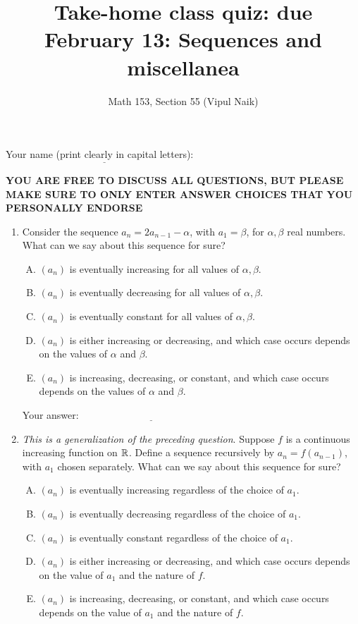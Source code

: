\documentclass[10pt]{amsart}
\title{Take-home class quiz: due February 13: Sequences and miscellanea}
\author{Math 153, Section 55 (Vipul Naik)}
\begin{document}
\maketitle

Your name (print clearly in capital letters): $\underline{\qquad\qquad\qquad\qquad\qquad\qquad\qquad\qquad\qquad\qquad}$

{\bf YOU ARE FREE TO DISCUSS ALL QUESTIONS, BUT PLEASE MAKE SURE TO
ONLY ENTER ANSWER CHOICES THAT YOU PERSONALLY ENDORSE}

\begin{enumerate}
\item Consider the sequence $a_n = 2a_{n-1} - \alpha$, with $a_1 =
  \beta$, for $\alpha, \beta$ real numbers. What can we say about this
  sequence for sure?

  \begin{enumerate}[(A)]
  \item $(a_n)$ is eventually increasing for all values of $\alpha,
    \beta$.
  \item $(a_n)$ is eventually decreasing for all values of $\alpha,
    \beta$.
  \item $(a_n)$ is eventually constant for all values of $\alpha,
    \beta$.
  \item $(a_n)$ is either increasing or decreasing, and which case
    occurs depends on the values of $\alpha$ and $\beta$.
  \item $(a_n)$ is increasing, decreasing, or constant, and which case
    occurs depends on the values of $\alpha$ and $\beta$.
  \end{enumerate}

  \vspace{0.1in}
  Your answer: $\underline{\qquad\qquad\qquad\qquad\qquad\qquad\qquad}$
  \vspace{0.15in}

\item {\em This is a generalization of the preceding question}. Suppose
  $f$ is a continuous increasing function on $\mathbb{R}$. Define a sequence
  recursively by $a_n = f(a_{n-1})$, with $a_1$ chosen
  separately. What can we say about this sequence for sure?
  \begin{enumerate}[(A)]
  \item $(a_n)$ is eventually increasing regardless of the choice of $a_1$.
  \item $(a_n)$ is eventually decreasing regardless of the choice of $a_1$.
  \item $(a_n)$ is eventually constant regardless of the choice of $a_1$.
  \item $(a_n)$ is either increasing or decreasing, and which case
    occurs depends on the value of $a_1$ and the nature of $f$.
  \item $(a_n)$ is increasing, decreasing, or constant, and which case
    occurs depends on the value of $a_1$ and the nature of $f$.
  \end{enumerate}


\end{enumerate}
\end{document}

